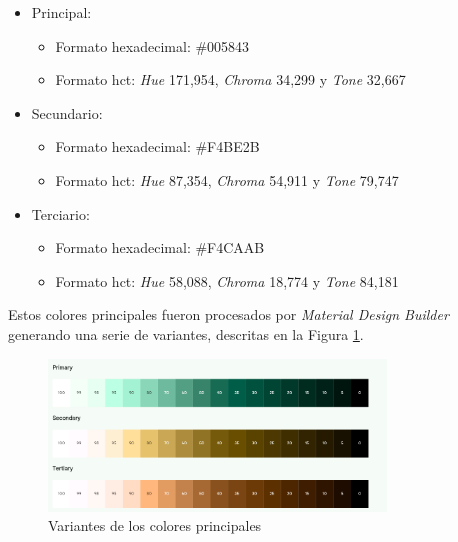             \begin{itemize}
                \item Principal: 
                    \begin{itemize}
                        \item Formato hexadecimal: \#005843
                        \item Formato \gls{hct}: \textit{Hue} 171,954, \textit{Chroma} 34,299 y \textit{Tone} 32,667
                    \end{itemize}
                \item Secundario: 
                    \begin{itemize}
                        \item Formato hexadecimal: \#F4BE2B
                        \item Formato \gls{hct}: \textit{Hue} 87,354, \textit{Chroma} 54,911 y \textit{Tone} 79,747
                    \end{itemize}
                \item Terciario:
                    \begin{itemize}
                        \item Formato hexadecimal: \#F4CAAB
                        \item Formato \gls{hct}: \textit{Hue} 58,088, \textit{Chroma} 18,774 y \textit{Tone} 84,181
                    \end{itemize}
                
            \end{itemize}

            Estos colores principales fueron procesados por \textit{Material Design Builder} generando una serie de variantes, descritas en la Figura \ref{figure:disenio:variantes_colores_principales}. 

            \begin{figure}[h]
                \centering
                \includegraphics[width=0.8\textwidth]{figures/diseno/colores/Variantes de los colores principales.png}
                \caption{Variantes de los colores principales}
                \label{figure:disenio:variantes_colores_principales}
            \end{figure}

